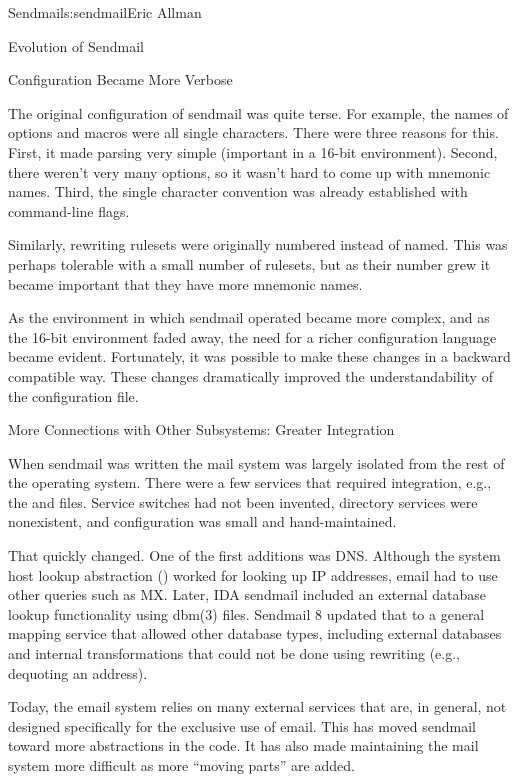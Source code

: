 \begin{aosachapter}{Sendmail}{s:sendmail}{Eric Allman}
\begin{aosasect1}{Evolution of Sendmail}
\begin{aosasect2}{Configuration Became More Verbose}

The original configuration of sendmail was quite terse. For example,
the names of options and macros were all single characters. There were
three reasons for this. First, it made parsing very simple (important in
a 16-bit environment). Second, there weren't very many options, so it
wasn't hard to come up with mnemonic names.
Third,
the single character convention was already established
with command-line flags.

Similarly, rewriting rulesets were originally numbered instead of
named. This was perhaps tolerable with a small number of rulesets, but
as their number grew it became important that they have more mnemonic
names.

As the environment in which sendmail operated became more complex, and
as the 16-bit environment faded away, the need for a richer
configuration language became evident. Fortunately, it was possible to
make these changes in a backward compatible way. These changes
dramatically improved the understandability of the configuration file.

\end{aosasect2}

\begin{aosasect2}{More Connections with Other Subsystems: Greater Integration}

When sendmail was written the mail system was largely isolated from
the rest of the operating system.  There were a few services that
required integration, e.g., the  and
 files.  Service switches had not been invented,
directory services were nonexistent, and configuration was small and
hand-maintained.

That quickly changed. One of the first additions was DNS\@. Although the
system host lookup abstraction () worked for
looking up IP addresses, email had to use other queries such as
MX\@. Later, IDA sendmail included an external database lookup
functionality using dbm(3) files.  Sendmail 8 updated that to a
general mapping service that allowed other database types, including
external databases and internal transformations that could not be done
using rewriting (e.g., dequoting an address).

Today, the email system relies on many external services that are, in
general, not designed specifically for the exclusive use of email.
This has moved sendmail toward more abstractions in the code. It has
also made maintaining the mail system more difficult as more ``moving
parts'' are added.


\end{aosasect2}
\end{aosasect1}
\end{aosachapter}
